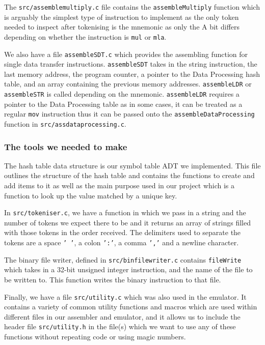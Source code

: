 \documentclass[11pt]{article}
\begin{document}
\par
The \texttt{src/assemblemultiply.c} file contains the \texttt{assembleMultiply} function which is arguably the simplest type of instruction to implement as the only token needed to inspect after tokenising is the mnemonic as only the A bit differs depending on whether the instruction is \texttt{mul} or \texttt{mla}.
\par
We also have a file \texttt{assembleSDT.c} which provides the assembling function for single data transfer instructions. \texttt{assembleSDT} takes in the string instruction, the last memory address, the program counter, a pointer to the Data Processing hash table, and an array containing the previous memory addresses. \texttt{assembleLDR} or \texttt{assembleSTR} is called depending on the mnemonic. \texttt{assembleLDR} requires a pointer to the Data Processing table as in some cases, it can be treated as a regular \texttt{mov} instruction thus it can be passed onto the \texttt{assembleDataProcessing} function in \texttt{src/assdataprocessing.c}.
\subsubsection{The tools we needed to make}
The hash table data structure is our symbol table ADT we implemented. This file outlines the structure of the hash table and contains the functions to create and add items to it as well as the main purpose used in our project which is a function to look up the value matched by a unique key.
\par
In \texttt{src/tokeniser.c}, we have a function in which we pass in a string and the number of tokens we expect there to be and it returns an array of strings filled with those tokens in the order received. The delimiters used to separate the tokens are a space \texttt{' '}, a colon \texttt{':'}, a comma \texttt{','} and a newline character.
\par
The binary file writer, defined in \texttt{src/binfilewriter.c} contains \texttt{fileWrite} which takes in a 32-bit unsigned integer instruction, and the name of the file to be written to. This function writes the binary instruction to that file.
\par
Finally, we have a file \texttt{src/utility.c} which was also used in the emulator. It contains a variety of common utility functions and macros which are used within different files in our assembler and emulator, and it allows us to include the header file \texttt{src/utility.h} in the file(s) which we want to use any of these functions without repeating code or using magic numbers.
\end{document}
